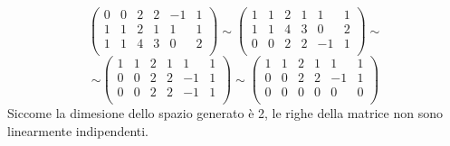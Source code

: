 \begin{example}
  $$
    \begin{pmatrix}
      0 & 0 & 2 & 2 & -1 & 1 \\
      1 & 1 & 2 & 1 & 1  & 1 \\
      1 & 1 & 4 & 3 & 0  & 2 \\
    \end{pmatrix}
    \sim
    \begin{pmatrix}
      1 & 1 & 2 & 1 & 1  & 1 \\
      1 & 1 & 4 & 3 & 0  & 2 \\
      0 & 0 & 2 & 2 & -1 & 1 \\
    \end{pmatrix}
    \sim
  $$
  $$
    \sim
    \begin{pmatrix}
      1 & 1 & 2 & 1 & 1  & 1 \\
      0 & 0 & 2 & 2 & -1 & 1 \\
      0 & 0 & 2 & 2 & -1 & 1 \\
    \end{pmatrix}
    \sim
    \begin{pmatrix}
      1 & 1 & 2 & 1 & 1  & 1 \\
      0 & 0 & 2 & 2 & -1 & 1 \\
      0 & 0 & 0 & 0 & 0  & 0 \\
    \end{pmatrix}
  $$
  Siccome la dimesione dello spazio generato è 2, le righe della matrice non sono linearmente indipendenti.
\end{example}
